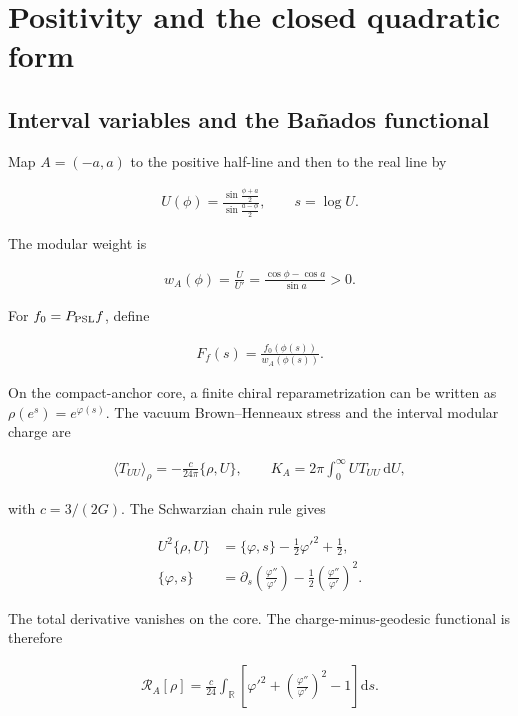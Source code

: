 \section{Positivity and the closed quadratic form}\label{sec:positivity}

\subsection{Interval variables and the Bañados functional}\label{subsec:banados-functional}

Map $A=(-a,a)$ to the positive half-line and then to the real line by

\begin{align}
U(\phi)
=\frac{\sin\frac{\phi+a}{2}}
{\sin\frac{a-\phi}{2}},
\qquad
s=\log U.
\end{align}

The modular weight is

\begin{align}
w_A(\phi)=\frac{U}{U'}
=\frac{\cos\phi-\cos a}{\sin a}>0.
\end{align}

For $f_0=P_{\rm PSL}f$, define

\begin{align}
F_f(s)=\frac{f_0(\phi(s))}{w_A(\phi(s))}.
\end{align}

On the compact-anchor core, a finite chiral reparametrization can be written as $\rho(e^s)=e^{\varphi(s)}$. The vacuum Brown--Henneaux stress and the interval modular charge are

\begin{align}
\langle T_{UU}\rangle_\rho
=-\frac{c}{24\pi}\{\rho,U\},
\qquad
K_A=2\pi\int_0^\infty U T_{UU}\,\mathrm dU,
\end{align}

with $c=3/(2G)$. The Schwarzian chain rule gives

\begin{align}
U^2\{\rho,U\}
&=\{\varphi,s\}-\frac12\varphi'^2+\frac12,\\
\{\varphi,s\}
&=\partial_s\left(\frac{\varphi''}{\varphi'}\right)
-\frac12\left(\frac{\varphi''}{\varphi'}\right)^2.
\end{align}

The total derivative vanishes on the core. The charge-minus-geodesic functional is therefore

\begin{align}
\mathcal R_A[\rho]
=\frac{c}{24}\int_{\mathbb R}
\left[
\varphi'^2+\left(\frac{\varphi''}{\varphi'}\right)^2-1
\right]\mathrm ds . \label{eq:schwarzian-functional}
\end{align}

